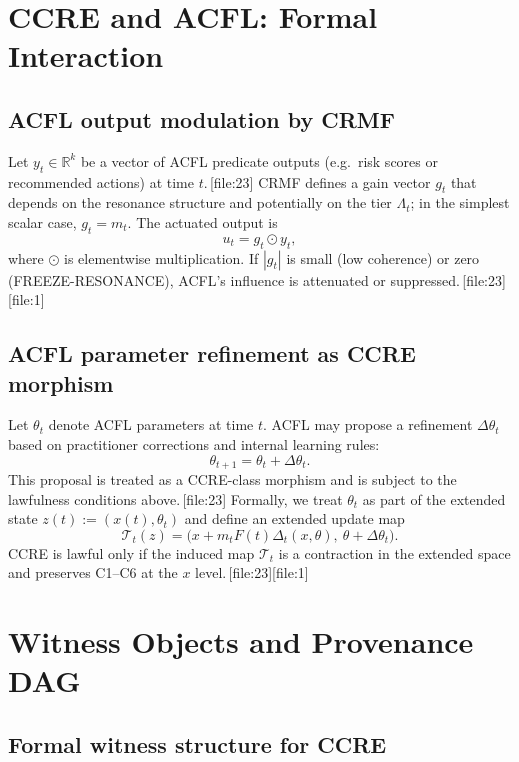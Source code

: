 \documentclass[11pt]{article}
\begin{document}
\section{CCRE and ACFL: Formal Interaction}

\subsection{ACFL output modulation by CRMF}

Let $y_t \in \mathbb{R}^k$ be a vector of ACFL predicate outputs (e.g.\ risk scores or recommended actions) at time $t$.\,[file:23]
CRMF defines a gain vector $g_t$ that depends on the resonance structure and potentially on the tier $\Lambda_t$; in the simplest scalar case, $g_t = m_t$.
The actuated output is
\[
  u_t = g_t \odot y_t,
\]
where $\odot$ is elementwise multiplication.
If $|g_t|$ is small (low coherence) or zero (FREEZE-RESONANCE), ACFL's influence is attenuated or suppressed.\,[file:23][file:1]

\subsection{ACFL parameter refinement as CCRE morphism}

Let $\theta_t$ denote ACFL parameters at time $t$.
ACFL may propose a refinement $\Delta\theta_t$ based on practitioner corrections and internal learning rules:
\[
  \theta_{t+1} = \theta_t + \Delta\theta_t.
\]
This proposal is treated as a CCRE-class morphism and is subject to the lawfulness conditions above.\,[file:23]
Formally, we treat $\theta_t$ as part of the extended state $z(t) := (x(t),\theta_t)$ and define an extended update map
\[
  \mathcal{T}_t(z) = \bigl(x + m_t F(t)\Delta_t(x,\theta),\ \theta + \Delta\theta_t\bigr).
\]
CCRE is lawful only if the induced map $\mathcal{T}_t$ is a contraction in the extended space and preserves C1--C6 at the $x$ level.\,[file:23][file:1]

\section{Witness Objects and Provenance DAG}

\subsection{Formal witness structure for CCRE}
\end{document}
